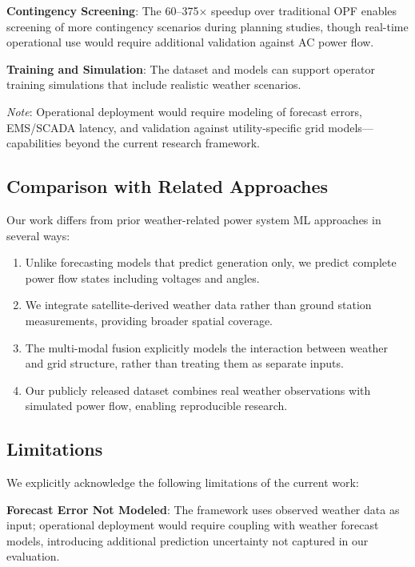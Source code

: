 \documentclass[journal,12pt,onecolumn]{IEEEtran}
\begin{document}
\textbf{Contingency Screening}: The 60--375$\times$ speedup over traditional OPF enables screening of more contingency scenarios during planning studies, though real-time operational use would require additional validation against AC power flow.

\textbf{Training and Simulation}: The dataset and models can support operator training simulations that include realistic weather scenarios.

\textit{Note}: Operational deployment would require modeling of forecast errors, EMS/SCADA latency, and validation against utility-specific grid models---capabilities beyond the current research framework.

\subsection{Comparison with Related Approaches}

Our work differs from prior weather-related power system ML approaches in several ways:

\begin{enumerate}
    \item Unlike forecasting models that predict generation only, we predict complete power flow states including voltages and angles.
    
    \item We integrate satellite-derived weather data rather than ground station measurements, providing broader spatial coverage.
    
    \item The multi-modal fusion explicitly models the interaction between weather and grid structure, rather than treating them as separate inputs.
    
    \item Our publicly released dataset combines real weather observations with simulated power flow, enabling reproducible research.
\end{enumerate}

\subsection{Limitations}

We explicitly acknowledge the following limitations of the current work:

\textbf{Forecast Error Not Modeled}: The framework uses observed weather data as input; operational deployment would require coupling with weather forecast models, introducing additional prediction uncertainty not captured in our evaluation.
\end{document}
